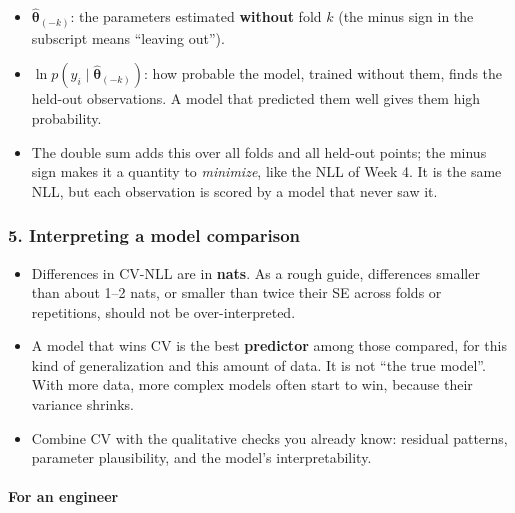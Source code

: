 \begin{itemize}
\tightlist
\item
  \(\hat{\boldsymbol\theta}_{(-k)}\): the parameters estimated
  \textbf{without} fold \(k\) (the minus sign in the subscript means
  ``leaving out'').
\item
  \(\ln p(y_i \mid \hat{\boldsymbol\theta}_{(-k)})\): how probable the
  model, trained without them, finds the held-out observations. A model
  that predicted them well gives them high probability.
\item
  The double sum adds this over all folds and all held-out points; the
  minus sign makes it a quantity to \emph{minimize}, like the NLL of
  Week 4. It is the same NLL, but each observation is scored by a model
  that never saw it.
\end{itemize}

\subsubsection{5. Interpreting a model comparison}

\begin{itemize}
\tightlist
\item
  Differences in CV-NLL are in \textbf{nats}. As a rough guide,
  differences smaller than about 1--2 nats, or smaller than twice their
  SE across folds or repetitions, should not be over-interpreted.
\item
  A model that wins CV is the best \textbf{predictor} among those
  compared, for this kind of generalization and this amount of data. It
  is not ``the true model''. With more data, more complex models often
  start to win, because their variance shrinks.
\item
  Combine CV with the qualitative checks you already know: residual
  patterns, parameter plausibility, and the model's interpretability.
\end{itemize}

\paragraph{For an engineer}

